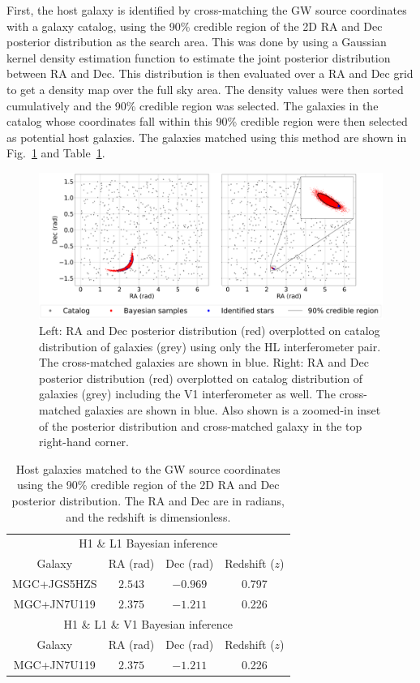 \documentclass[11pt,a4paper]{article}
\begin{document}
First, the host galaxy is identified by cross-matching the GW source coordinates with a galaxy catalog, using the 90\% credible region of the 2D RA and Dec posterior distribution as the search area. This was done by using a Gaussian kernel density estimation function to estimate the joint posterior distribution between RA and Dec. This distribution is then evaluated over a RA and Dec grid to get a density map over the full sky area. The density values were then sorted cumulatively and the 90\% credible region was selected. The galaxies in the catalog whose coordinates fall within this 90\% credible region were then selected as potential host galaxies. The galaxies matched using this method are shown in Fig.~\ref{fig:matched_galaxies} and Table~\ref{tab:galaxies}.

\begin{figure}[h]
    \includegraphics[width=\columnwidth, keepaspectratio]{../figures/kde_crossmatch.png}
    \caption{Left: RA and Dec posterior distribution (red) overplotted on catalog distribution of galaxies (grey) using only the HL interferometer pair. The cross-matched galaxies are shown in blue. Right: RA and Dec posterior distribution (red) overplotted on catalog distribution of galaxies (grey) including the V1 interferometer as well. The cross-matched galaxies are shown in blue. Also shown is a zoomed-in inset of the posterior distribution and cross-matched galaxy in the top right-hand corner.}
    \label{fig:matched_galaxies}
\end{figure}

\begin{table}[h]
    \centering
    \begin{tabular}{c|c|c|c}
    \multicolumn{4}{c}{H1 \& L1 Bayesian inference} \\
    Galaxy & RA (rad) & Dec (rad) & Redshift ($z$) \\
    \hline
    MGC+JGS5HZS & $2.543$ & $-0.969$ & 0.797 \\
    MGC+JN7U119 & $2.375$ & $-1.211$ & 0.226 \\
    \hline
    \multicolumn{4}{c}{H1 \& L1 \& V1 Bayesian inference} \\
    Galaxy & RA (rad) & Dec (rad) & Redshift ($z$) \\
    \hline
    MGC+JN7U119 & $2.375$ & $-1.211$ & 0.226 \\
    \end{tabular}
    \caption{Host galaxies matched to the GW source coordinates using the 90\% credible region of the 2D RA and Dec posterior distribution. The RA and Dec are in radians, and the redshift is dimensionless.}
    \label{tab:galaxies}
\end{table}
\end{document}

